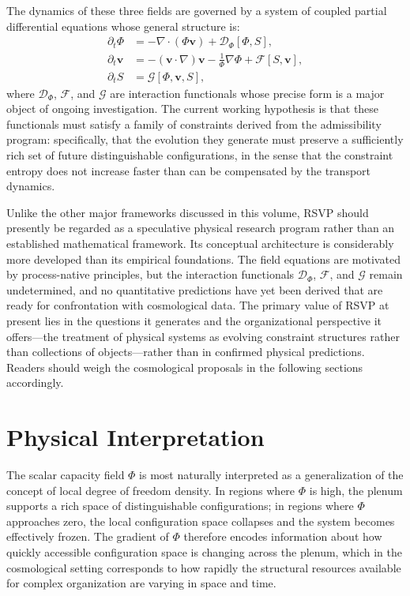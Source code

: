 \documentclass[11pt, oneside]{book}
\theoremstyle{definition}
\theoremstyle{remark}
\begin{document}
The dynamics of these three fields are governed by a system of coupled partial differential equations whose general structure is:
\begin{align}
\partial_t \Phi &= -\nabla \cdot (\Phi \mathbf{v}) + \mathcal{D}_\Phi[\Phi, S], \\
\partial_t \mathbf{v} &= -(\mathbf{v} \cdot \nabla)\mathbf{v} - \frac{1}{\Phi}\nabla \Phi + \mathcal{F}[S, \mathbf{v}], \\
\partial_t S &= \mathcal{G}[\Phi, \mathbf{v}, S],
\end{align}
where $\mathcal{D}_\Phi$, $\mathcal{F}$, and $\mathcal{G}$ are interaction functionals whose precise form is a major object of ongoing investigation. The current working hypothesis is that these functionals must satisfy a family of constraints derived from the admissibility program: specifically, that the evolution they generate must preserve a sufficiently rich set of future distinguishable configurations, in the sense that the constraint entropy does not increase faster than can be compensated by the transport dynamics.

\begin{summarybox}
Unlike the other major frameworks discussed in this volume, RSVP should presently be regarded as a speculative physical research program rather than an established mathematical framework. Its conceptual architecture is considerably more developed than its empirical foundations. The field equations are motivated by process-native principles, but the interaction functionals $\mathcal{D}_\Phi$, $\mathcal{F}$, and $\mathcal{G}$ remain undetermined, and no quantitative predictions have yet been derived that are ready for confrontation with cosmological data. The primary value of RSVP at present lies in the questions it generates and the organizational perspective it offers---the treatment of physical systems as evolving constraint structures rather than collections of objects---rather than in confirmed physical predictions. Readers should weigh the cosmological proposals in the following sections accordingly.
\end{summarybox}

\section{Physical Interpretation}

The scalar capacity field $\Phi$ is most naturally interpreted as a generalization of the concept of local degree of freedom density. In regions where $\Phi$ is high, the plenum supports a rich space of distinguishable configurations; in regions where $\Phi$ approaches zero, the local configuration space collapses and the system becomes effectively frozen. The gradient of $\Phi$ therefore encodes information about how quickly accessible configuration space is changing across the plenum, which in the cosmological setting corresponds to how rapidly the structural resources available for complex organization are varying in space and time.
\end{document}
